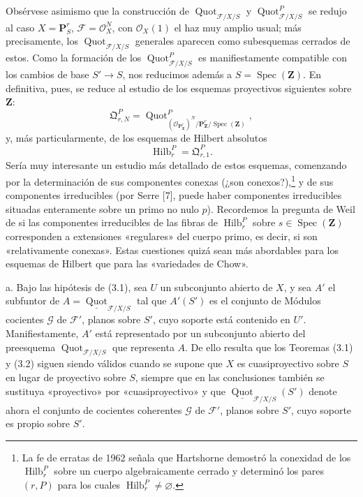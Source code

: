  Obsérvese asimismo que la construcción de
$\operatorname{Quot}_{\mathcal F/X/S}$ y
$\operatorname{Quot}^P_{\mathcal F/X/S}$ se redujo al caso
$X=\mathbf P^r_S$, $\mathcal F=\mathcal O_X^N$, con $\mathcal O_X(1)$ el haz
muy amplio usual; más precisamente, los
$\operatorname{Quot}_{\mathcal F/X/S}$ generales aparecen como subesquemas
cerrados de estos. Como la formación de los
$\operatorname{Quot}^P_{\mathcal F/X/S}$ es manifiestamente compatible con
los cambios de base $S'\longrightarrow S$, nos reducimos además a
$S=\operatorname{Spec}(\mathbf Z)$. En definitiva, pues, se reduce al estudio
de los esquemas proyectivos siguientes sobre $\mathbf Z$:
\[
\mathfrak Q^P_{r,N}=
\operatorname{Quot}^{P}_{(\mathcal O_{\mathbf P^r_{\mathbf Z}})^N/
\mathbf P^r_{\mathbf Z}/\operatorname{Spec}(\mathbf Z)},
\]
y, más particularmente, de los esquemas de Hilbert absolutos
\[
\operatorname{Hilb}^P_r=\mathfrak Q^P_{r,1}.
\]
Sería muy interesante un estudio más detallado de estos esquemas, comenzando
por la determinación de sus componentes conexas (¿son conexos?),\footnote{La
fe de erratas de 1962 señala que Hartshorne demostró la conexidad de los
$\operatorname{Hilb}^P_r$ sobre un cuerpo algebraicamente cerrado y determinó
los pares $(r,P)$ para los cuales
$\operatorname{Hilb}^P_r\neq\varnothing$.} y de sus componentes irreducibles
(por Serre [7], puede haber componentes irreducibles situadas enteramente sobre
un primo no nulo $p$). Recordemos la pregunta de Weil de si las componentes
irreducibles de las fibras de $\operatorname{Hilb}^P_r$ sobre
$s\in\operatorname{Spec}(\mathbf Z)$ corresponden a extensiones «regulares»
del cuerpo primo, es decir, si son «relativamente conexas». Estas cuestiones
quizá sean más abordables para los esquemas de Hilbert que para las
«variedades de Chow».


\noindent a. Bajo las hipótesis de (3.1), sea $U$ un subconjunto abierto de
$X$, y sea $A'$ el subfuntor de
$A=\underline{\operatorname{Quot}}_{\mathcal F/X/S}$ tal que $A'(S')$ es el
conjunto de Módulos cocientes $\mathcal G$ de $\mathcal F'$, planos sobre
$S'$, cuyo soporte está contenido en $U'$. Manifiestamente, $A'$ está
representado por un subconjunto abierto del preesquema
$\operatorname{Quot}_{\mathcal F/X/S}$ que representa $A$. De ello resulta
que los Teoremas (3.1) y (3.2)
siguen siendo válidos cuando se supone que $X$ es cuasiproyectivo sobre $S$ en
lugar de proyectivo sobre $S$, siempre que en las conclusiones también se
sustituya «proyectivo» por «cuasiproyectivo» y que
$\underline{\operatorname{Quot}}_{\mathcal F/X/S}(S')$ denote ahora el
conjunto de cocientes coherentes $\mathcal G$ de $\mathcal F'$, planos sobre
$S'$, cuyo soporte es propio sobre $S'$.


